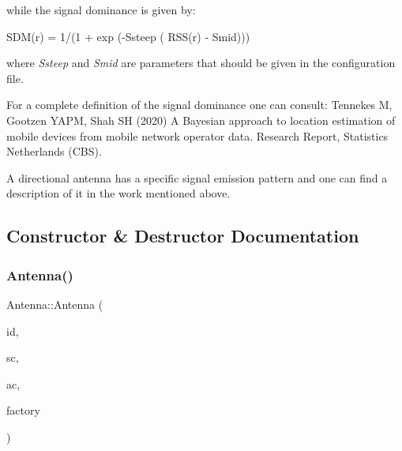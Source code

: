 while the signal dominance is given by\+:

S\+D\+M(r) = 1/(1 + exp (-\/\+Ssteep ( R\+S\+S(r) -\/ Smid)))

where {\itshape Ssteep} and {\itshape Smid} are parameters that should be given in the configuration file.

For a complete definition of the signal dominance one can consult\+: Tennekes M, Gootzen Y\+A\+PM, Shah SH (2020) A Bayesian approach to location estimation of mobile devices from mobile network operator data. Research Report, Statistics Netherlands (C\+BS).

A directional antenna has a specific signal emission pattern and one can find a description of it in the work mentioned above. 

\subsection{Constructor \& Destructor Documentation}
\mbox{\label{class_antenna_a3ffd61a2c9634c3cb6449c6b1e2d0ff8}} 
\subsubsection{\texorpdfstring{Antenna()}{Antenna()}}
{\footnotesize\ttfamily Antenna\+::\+Antenna (\begin{DoxyParamCaption}\item[{const unsigned long}]{id,  }\item[{\hyperlink{class_simulation_configuration}{Simulation\+Configuration} $\ast$}]{sc,  }\item[{\hyperlink{class_antenna_configuration}{Antenna\+Configuration}}]{ac,  }\item[{\hyperlink{class_event_factory}{Event\+Factory} $\ast$}]{factory }\end{DoxyParamCaption})\hspace{0.3cm}{\ttfamily [explicit]}}

